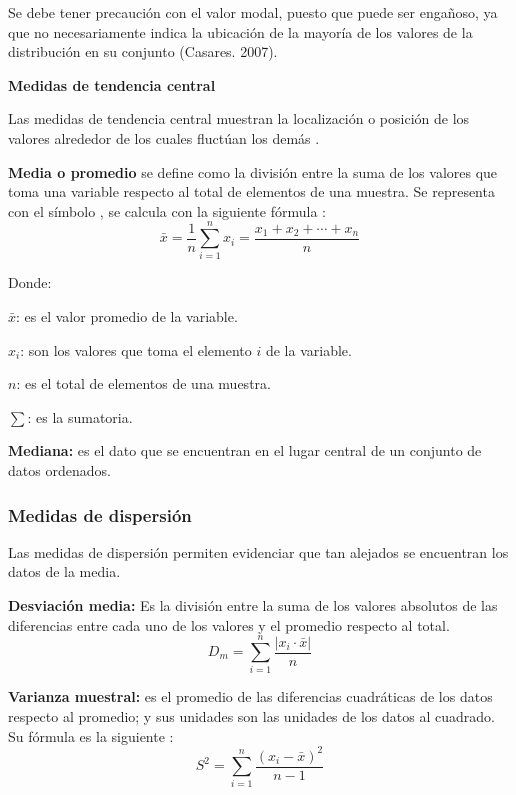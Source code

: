 \documentclass[a5paper,doc,10pt,noapacite]{apa6}
\begin{document}
{{Se debe tener precaución con el valor modal, puesto que puede ser engañoso, ya que no necesariamente indica la ubicación de la mayoría de los valores de la distribución en su conjunto (Casares. 2007).

\textbf{Medidas de tendencia central}

Las medidas de tendencia central muestran la localización o posición de los valores alrededor de los cuales fluctúan los demás \cite{Vargas-1995}.

\textbf{Media o promedio} se define como la división entre la suma de los valores que toma una variable respecto al total de elementos de una muestra. Se representa con el símbolo , se calcula con la siguiente fórmula \cite{Vargas-1995}:   
\[
	\bar{x}= \dfrac{1}{n} \sum \limits_{i=1}^{n} x_{i} = \dfrac{x_{1}+x_{2}+ \cdots+x_{n}}{n}
\]

Donde:
\begin{APAitemize}
\item \(\bar{x}\): es el valor promedio de la variable.
\item \(x_{i}\): son los valores que toma el elemento \(i\) de la variable.
\item \(n\): es el total de elementos de una muestra.
\item \(\sum\): es la sumatoria.
\end{APAitemize}

\vspace{1\baselineskip}
\textbf{Mediana:} es el dato que se encuentran en el lugar central de un conjunto de datos ordenados. 



\newpage



\subsubsection{Medidas de dispersión}
Las medidas de dispersión permiten evidenciar que tan alejados se encuentran los datos de la media.

\vspace{1\baselineskip}
\textbf{Desviación media:} Es la división entre la suma de los valores absolutos de las diferencias entre cada uno de los valores y el promedio respecto al total.
\[
	D_{m}= \sum_{i=1}^{n} \dfrac{|x_{i} \cdot \bar{x}|}{n}
\] 

\textbf{Varianza muestral:} es el promedio de las diferencias cuadráticas de los datos respecto al promedio; y sus unidades son las unidades de los datos al cuadrado. Su fórmula es la siguiente \cite{Vargas-1995}:
\[
	S^{2}= \sum_{i=1}^{n} \dfrac{ \left( x_{i}-\bar{x} \right)^{2}}{n-1}
\]

}}
\end{document}

